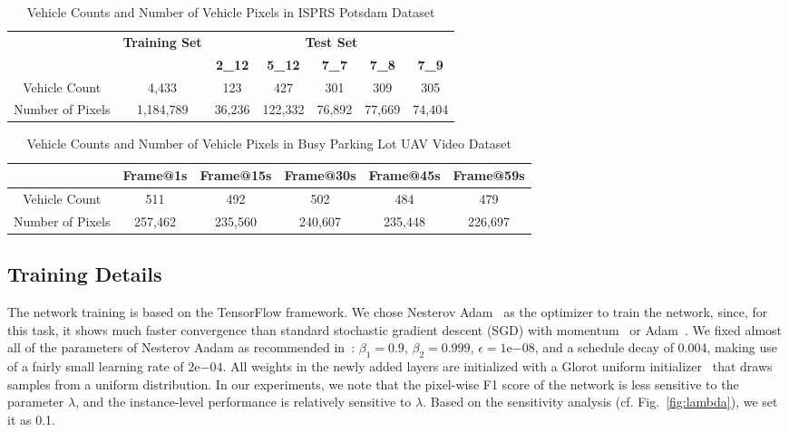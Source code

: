 \documentclass[journal]{IEEEtran}
\newcommand{\RR}[2]{\textcolor[rgb]{0,0,0}
{#2}}
\begin{document}
\begin{table*}[t]
\caption{\label{tab:potsdam} Vehicle Counts and Number of Vehicle Pixels in ISPRS Potsdam Dataset}
\centering
\begin{tabular}{ccccccc}
\toprule
 & \multirow{2}{*}{\textbf{Training Set}} & \multicolumn{5}{c}{\textbf{Test Set}} \\
\cline{3-7}
 & & \textbf{2\_12} & \textbf{5\_12} & \textbf{7\_7} & \textbf{7\_8} & \textbf{7\_9} \\
\hline
Vehicle Count & 4,433 & 123 & 427 & 301 & 309 & 305 \\
Number of Pixels & 1,184,789 & 36,236 & 122,332 & 76,892 & 77,669 & 74,404 \\
\bottomrule
\end{tabular}
\end{table*}

\begin{table*}[t]
\caption{\label{tab:parkinglot} Vehicle Counts and Number of Vehicle Pixels in Busy Parking Lot UAV Video Dataset}
\centering
\begin{tabular}{cccccc}
\toprule
 & \textbf{Frame@1s} & \textbf{Frame@15s} & \textbf{Frame@30s} & \textbf{Frame@45s} & \textbf{Frame@59s} \\
\hline
Vehicle Count & 511 & 492 & 502 & 484 & 479 \\
Number of Pixels & 257,462 & 235,560 & 240,607 & 235,448 & 226,697 \\
\bottomrule
\end{tabular}
\end{table*}

\subsection{Training Details}
The network training is based on the TensorFlow framework. We chose Nesterov Adam~\cite{nadam2,nadam1} as the optimizer to train the network, since, for this task, it shows much faster convergence than standard stochastic gradient descent (SGD) with momentum~\cite{sgd} or Adam~\cite{adam}. We fixed almost all of the parameters of Nesterov Aadam as recommended in~\cite{nadam2}: $\beta_1=0.9$, $\beta_2=0.999$, $\epsilon=1\mathrm{e}{-08}$, and a schedule decay of 0.004, making use of a fairly small learning rate of $2\mathrm{e}{-04}$. All weights in the newly added layers are initialized with a Glorot uniform initializer~\cite{Glorot_normal} that draws samples from a uniform distribution. \RR{}{In our experiments, we note that the pixel-wise F1 score of the network is less sensitive to the parameter $\lambda$, and the instance-level performance is relatively sensitive to $\lambda$. Based on the sensitivity analysis (cf. Fig.~\ref{fig:lambda}), we set it as 0.1.}
\end{document}
